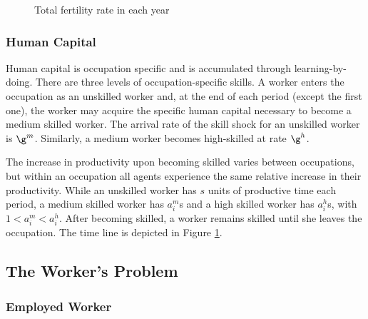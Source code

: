 \documentclass[12pt]{article}
\theoremstyle{definition}
\begin{document}
\begin{figure}[H]
    \noindent\caption{Total fertility rate in each year}
    \begin{center}
        \label{ritterOffshoringOccupationalSpecificity2014_fig2}
    \end{center}
\end{figure}

\subsubsection{Human Capital}

Human capital is occupation specific and is accumulated through learning-by-doing. There are three levels of occupation-specific skills. A worker enters the occupation as an unskilled worker and, at the end of each period (except the first one), the worker may acquire the specific human capital necessary to become a medium skilled worker. The arrival rate of the skill shock for an unskilled worker is $\g^m$. Similarly, a medium worker becomes high-skilled at rate $\g^h$.

The increase in productivity upon becoming skilled varies between occupations, but within an occupation all agents experience the same relative increase in their productivity. While an unskilled worker has $s$ units of productive time each period, a medium skilled worker has $a_i^m$s and a high skilled worker has $a_i^h$s, with $1 < a_i^m < a_i^h$. After becoming skilled, a worker remains skilled until she leaves the occupation. The time line is depicted in Figure \ref{ritterOffshoringOccupationalSpecificity2014_fig2}.

\subsection{The Worker's Problem}

\subsubsection{Employed Worker}
\end{document}

